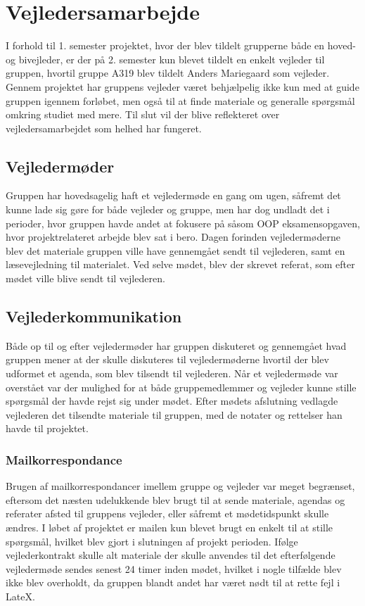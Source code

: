 \chapter{Vejledersamarbejde}\label{Vejldersamarbejde}
I forhold til 1. semester projektet, hvor der blev tildelt grupperne både en hoved- og bivejleder, er der på 2. semester kun blevet tildelt en enkelt vejleder til gruppen, hvortil gruppe A319 blev tildelt Anders Mariegaard som vejleder. Gennem projektet har gruppens vejleder været behjælpelig ikke kun med at guide gruppen igennem forløbet, men også til at finde materiale og generalle spørgsmål omkring studiet med mere. Til slut vil der blive reflekteret over vejledersamarbejdet som helhed har fungeret.

\section{Vejledermøder}\label{Vejledermoeder}
Gruppen har hovedsagelig haft et vejledermøde en gang om ugen, såfremt det kunne lade sig gøre for både vejleder og gruppe, men har dog undladt det i perioder, hvor gruppen havde andet at fokusere på såsom OOP eksamensopgaven, hvor projektrelateret arbejde blev sat i bero. Dagen forinden vejledermøderne blev det materiale gruppen ville have gennemgået sendt til vejlederen, samt en læsevejledning til materialet. Ved selve mødet, blev der skrevet referat, som efter mødet ville blive sendt til vejlederen.

\section{Vejlederkommunikation}\label{Vejlederkommunikation}
Både op til og efter vejledermøder har gruppen diskuteret og gennemgået hvad gruppen mener at der skulle diskuteres til vejledermøderne hvortil der blev udformet et agenda, som blev tilsendt til vejlederen. Når et vejledermøde var overstået var der mulighed for at både gruppemedlemmer og vejleder kunne stille spørgsmål der havde rejst sig under mødet. Efter mødets afslutning vedlagde vejlederen det tilsendte materiale til gruppen, med de notater og rettelser han havde til projektet. 

\subsection{Mailkorrespondance}\label{Mailkorrespondance}
Brugen af mailkorrespondancer imellem gruppe og vejleder var meget begrænset, eftersom det næsten udelukkende blev brugt til at sende materiale, agendas og referater afsted til gruppens vejleder, eller såfremt et mødetidspunkt skulle ændres. I løbet af projektet er mailen kun blevet brugt en enkelt til at stille spørgsmål, hvilket blev gjort i slutningen af projekt perioden. Ifølge vejlederkontrakt skulle alt materiale der skulle anvendes til det efterfølgende vejledermøde sendes senest 24 timer inden mødet, hvilket i nogle tilfælde blev ikke blev overholdt, da gruppen blandt andet har været nødt til at rette fejl i LateX.

